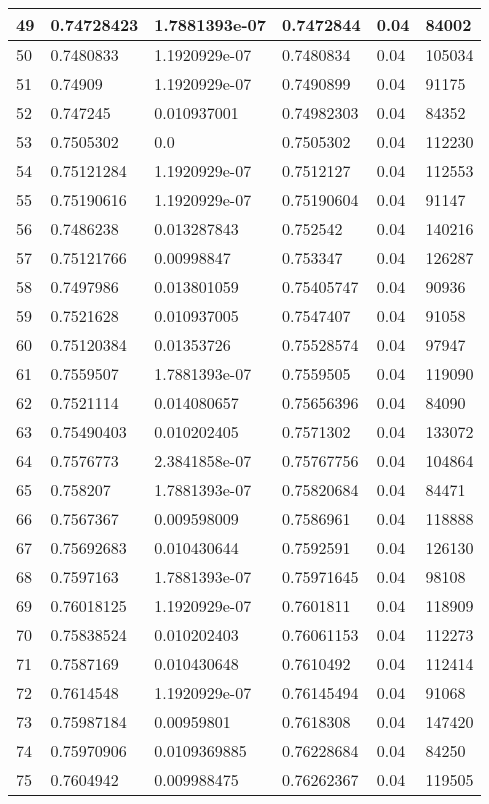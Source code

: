 \begin{longtable}{|l|l|l|l|l|l|}
49 & 0.74728423 & 1.7881393e-07 & 0.7472844 & 0.04 & 84002 \\ \hline 
50 & 0.7480833 & 1.1920929e-07 & 0.7480834 & 0.04 & 105034 \\ \hline 
51 & 0.74909 & 1.1920929e-07 & 0.7490899 & 0.04 & 91175 \\ \hline 
52 & 0.747245 & 0.010937001 & 0.74982303 & 0.04 & 84352 \\ \hline 
53 & 0.7505302 & 0.0 & 0.7505302 & 0.04 & 112230 \\ \hline 
54 & 0.75121284 & 1.1920929e-07 & 0.7512127 & 0.04 & 112553 \\ \hline 
55 & 0.75190616 & 1.1920929e-07 & 0.75190604 & 0.04 & 91147 \\ \hline 
56 & 0.7486238 & 0.013287843 & 0.752542 & 0.04 & 140216 \\ \hline 
57 & 0.75121766 & 0.00998847 & 0.753347 & 0.04 & 126287 \\ \hline 
58 & 0.7497986 & 0.013801059 & 0.75405747 & 0.04 & 90936 \\ \hline 
59 & 0.7521628 & 0.010937005 & 0.7547407 & 0.04 & 91058 \\ \hline 
60 & 0.75120384 & 0.01353726 & 0.75528574 & 0.04 & 97947 \\ \hline 
61 & 0.7559507 & 1.7881393e-07 & 0.7559505 & 0.04 & 119090 \\ \hline 
62 & 0.7521114 & 0.014080657 & 0.75656396 & 0.04 & 84090 \\ \hline 
63 & 0.75490403 & 0.010202405 & 0.7571302 & 0.04 & 133072 \\ \hline 
64 & 0.7576773 & 2.3841858e-07 & 0.75767756 & 0.04 & 104864 \\ \hline 
65 & 0.758207 & 1.7881393e-07 & 0.75820684 & 0.04 & 84471 \\ \hline 
66 & 0.7567367 & 0.009598009 & 0.7586961 & 0.04 & 118888 \\ \hline 
67 & 0.75692683 & 0.010430644 & 0.7592591 & 0.04 & 126130 \\ \hline 
68 & 0.7597163 & 1.7881393e-07 & 0.75971645 & 0.04 & 98108 \\ \hline 
69 & 0.76018125 & 1.1920929e-07 & 0.7601811 & 0.04 & 118909 \\ \hline 
70 & 0.75838524 & 0.010202403 & 0.76061153 & 0.04 & 112273 \\ \hline 
71 & 0.7587169 & 0.010430648 & 0.7610492 & 0.04 & 112414 \\ \hline 
72 & 0.7614548 & 1.1920929e-07 & 0.76145494 & 0.04 & 91068 \\ \hline 
73 & 0.75987184 & 0.00959801 & 0.7618308 & 0.04 & 147420 \\ \hline 
74 & 0.75970906 & 0.0109369885 & 0.76228684 & 0.04 & 84250 \\ \hline 
75 & 0.7604942 & 0.009988475 & 0.76262367 & 0.04 & 119505 \\ \hline 
\end{longtable}
